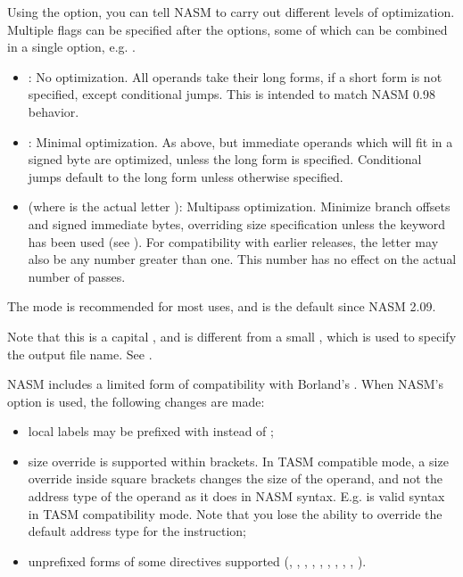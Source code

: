 Using the  option, you can tell NASM to carry out different
levels of optimization. Multiple flags can be specified after the
 options, some of which can be combined in a single option,
e.g. .

\begin{itemize}
    \item{: No optimization. All operands take their
        long forms, if a short form is not specified, except conditional
        jumps. This is intended to match NASM 0.98 behavior.}

    \item{: Minimal optimization. As above, but immediate
        operands which will fit in a signed byte are optimized,
        unless the long form is specified. Conditional jumps default
        to the long form unless otherwise specified.}

    \item{ (where  is the actual letter ):
        Multipass optimization. Minimize branch offsets and signed immediate
        bytes, overriding size specification unless the  keyword
        has been used (see ). For compatibility with earlier
        releases, the letter  may also be any number greater than
        one. This number has no effect on the actual number of passes.}
\end{itemize}

The  mode is recommended for most uses, and is the default
since NASM 2.09.

Note that this is a capital , and is different from a small ,
which is used to specify the output file name. See .


NASM includes a limited form of compatibility with Borland's .
When NASM's  option is used, the following changes are made:

\begin{itemize}
    \item{local labels may be prefixed with  instead of ;}

    \item{size override is supported within brackets. In TASM compatible mode,
        a size override inside square brackets changes the size of the operand,
        and not the address type of the operand as it does in NASM syntax. E.g.
         is valid syntax in TASM compatibility mode.
        Note that you lose the ability to override the default address type for
        the instruction;}

    \item{unprefixed forms of some directives supported (, ,
        , , , , ,
        , , ).}
\end{itemize}

